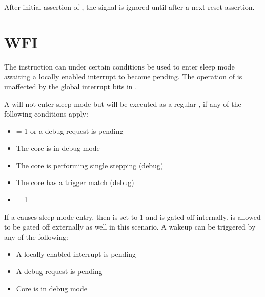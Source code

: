 \documentclass[letterpaper,10pt,english]{sphinxmanual}
\begin{document}
\sphinxAtStartPar
After initial assertion of , the  signal is ignored until after a next reset assertion.


\section{WFI}
\label{\detokenize{sleep:wfi}}\label{\detokenize{sleep:id2}}
\sphinxAtStartPar
The  instruction can under certain conditions be used to enter sleep mode awaiting a locally enabled
interrupt to become pending. The operation of  is unaffected by the global interrupt bits in .

\sphinxAtStartPar
A  will not enter sleep mode but will be executed as a regular , if any of the following conditions apply:
\begin{itemize}
\item {} 
\sphinxAtStartPar
{} = 1 or a debug request is pending

\item {} 
\sphinxAtStartPar
The core is in debug mode

\item {} 
\sphinxAtStartPar
The core is performing single stepping (debug)

\item {} 
\sphinxAtStartPar
The core has a trigger match (debug)

\item {} 
\sphinxAtStartPar
{} = 1

\end{itemize}

\sphinxAtStartPar
If a  causes sleep mode entry, then  is set to 1 and  is gated off internally.
 is allowed to be gated off externally as well in this scenario. A wake\sphinxhyphen{}up can be triggered by any of the following:
\begin{itemize}
\item {} 
\sphinxAtStartPar
A locally enabled interrupt is pending

\item {} 
\sphinxAtStartPar
A debug request is pending

\item {} 
\sphinxAtStartPar
Core is in debug mode

\end{itemize}
\end{document}
